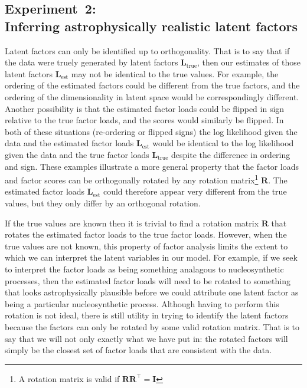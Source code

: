 \documentclass[twocolumn]{aastex61}
\newcommand{\vect}[1]{\boldsymbol{\mathbf{#1}}}
\renewcommand{\vec}[1]{\vect{#1}}
\newcommand{\transpose}{^\intercal}
\newcommand{\factorloads}{\textbf{L}}
\begin{document}
\subsection{Experiment~2:\\Inferring astrophysically realistic latent factors}

Latent factors can only be identified up to orthogonality. That is to say that
if the data were truely generated by latent factors $\factorloads_\textrm{true}$,
then our estimates of those latent factors $\factorloads_\textrm{est}$ may not
be identical to the true values. For example, the ordering of the estimated factors
could be different from the true factors, and the ordering of the dimensionality
in latent space would be correspondingly different. Another possibility is that
the estimated factor loads could be flipped in sign relative to the true factor
loads, and the scores would similarly be flipped. In both of these situations
(re-ordering or flipped signs) the log likelihood given the data and the
estimated factor loads $\factorloads_\textrm{est}$ would be identical to the
log likelihood given the data and the true factor loads $\factorloads_\textrm{true}$
despite the difference in ordering and sign. These examples illustrate a more 
general property that the factor loads and factor scores can be orthogonally 
rotated by any rotation matrix\footnote{A rotation matrix is valid if 
$\vec{R}\vec{R}\transpose = \vec{I}$} $\vec{R}$. The estimated factor loads 
$\factorloads_\textrm{est}$ could therefore appear very different from the true 
values, but they only differ by an orthogonal rotation. 


If the true values are known then it is trivial to find a rotation matrix $\vec{R}$
that rotates the estimated factor loads to the true factor loads. However, when
the true values are not known, this property of factor analysis limits the
extent to which we can interpret the latent variables in our model. For example,
if we seek to interpret the factor loads as being something analagous to 
nucleosynthetic processes, then the estimated factor loads will need to be 
rotated to something that looks astrophysically plausible before we could 
attribute one latent factor as being a particular nucleosynthetic process. 
Although having to perform this rotation is not ideal, there is still utility in
trying to identify the latent factors because the factors can only be rotated by
some valid rotation matrix. That is to say that we will not only exactly what
we have put in: the rotated factors will simply be the closest set of factor
loads that are consistent with the data.
\end{document}
